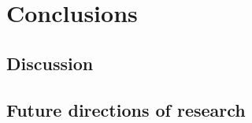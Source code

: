 \chapter*{Conclusions} %
\label{ch5}
\setlength{\parskip}{0.5pt}



\section*{Discussion}
\label{5.1}




\section*{Future directions of research}
\label{5.1}








